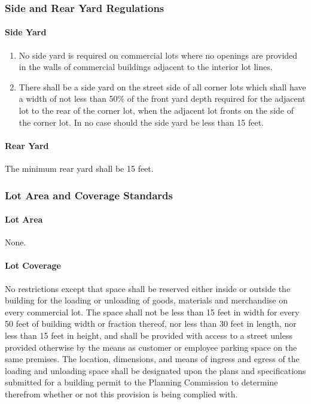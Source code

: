 \subsubsection{Side and Rear Yard Regulations}
\paragraph{Side Yard}
\begin{enumerate}[{\indent}1)]
    \item No side yard is required on commercial lots where no openings are provided in the walls of commercial buildings adjacent to the interior lot lines.
    \item There shall be a side yard on the street side of all corner lots which shall have a width of not less than 50\% of the front yard depth required for the adjacent lot to the rear of the corner lot, when the adjacent lot fronts on the side of the corner lot.  In no case should the side yard be less than 15 feet.
\end{enumerate}
\paragraph{Rear Yard}
The minimum rear yard shall be 15 feet.
\subsubsection{Lot Area and Coverage Standards}
\paragraph{Lot Area}
None.
\paragraph{Lot Coverage}
No restrictions except that space shall be reserved either inside or outside the building for the loading or unloading of goods, materials and merchandise on every commercial lot. The space shall not be less than 15 feet in width for every 50 feet of building width or fraction thereof, nor less than 30 feet in length, nor less than 15 feet in height, and shall be provided with access to a street unless provided otherwise by the means as customer or employee parking space on the same premises. The location, dimensions, and means of ingress and egress of the loading and unloading space shall be designated upon the plans and specifications submitted for a building permit to the Planning Commission to determine therefrom whether or not this provision is being complied with.
